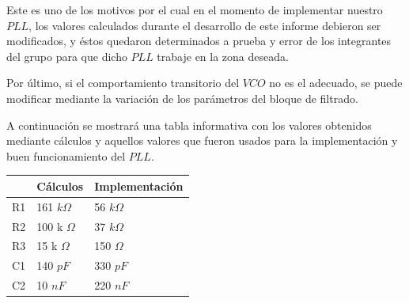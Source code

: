 \documentclass[twocolumn]{article}
\begin{document}
Este es uno de los motivos por el cual en el momento de implementar nuestro $PLL$, los valores calculados durante el desarrollo de este informe debieron ser modificados, y éstos quedaron determinados a prueba y error de los integrantes del grupo para que dicho $PLL$ trabaje en la zona deseada.

Por último, si el comportamiento transitorio del $VCO$ no es el adecuado, se puede modificar mediante la variación de los parámetros del bloque de filtrado.

A continuación se mostrará una tabla informativa con los valores obtenidos mediante cálculos y aquellos valores que fueron usados para la implementación y buen funcionamiento del $PLL$.

\begin{table}[H]
\centering
\begin{tabular}{|l|l|l|}
\hline
						  & Cálculos       & Implementación		\\ \hline
R1                        & 161 $k \Omega$ & 56 $k\Omega$		\\ \hline
R2                        & 100 k $\Omega$ & 37 $k \Omega$		\\ \hline
R3                        & 15 k $\Omega$  & 150 $\Omega$		\\ \hline
C1                        & 140 $pF$       & 330 $pF$			\\ \hline
C2                        & 10 $nF$        & 220 $nF$			\\ \hline
\end{tabular}
\end{table}
\end{document}
